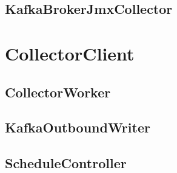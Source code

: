 %



\subsection{KafkaBrokerJmxCollector}



\section{CollectorClient}

\subsection{CollectorWorker}

\subsection{KafkaOutboundWriter}

\subsection{ScheduleController}

